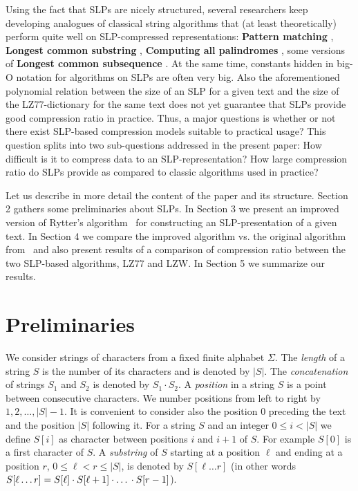 \documentclass[10pt]{article}
\begin{document}
Using the fact that SLPs are nicely structured, several researchers keep developing analogues of classical string
algorithms that (at least theoretically) perform quite well on SLP-compressed representations: \textbf{Pattern matching}
\cite{PM_and_HD}, \textbf{Longest common substring} \cite{LCSubstring}, \textbf{Computing all palindromes} \cite{LCSubstring}, some
versions of \textbf{Longest common subsequence} \cite{LCS_P}. At the same time, constants hidden in big-O notation for
algorithms on SLPs are often very big. Also the aforementioned polynomial relation between the size of an SLP for a
given text and the size of the LZ77-dictionary for the same text does not yet guarantee that SLPs provide good
compression ratio in practice. Thus, a major questions is whether or not there exist SLP-based compression models suitable
to practical usage? This question splits into two sub-questions addressed in the present paper: How difficult is it to
compress data to an SLP-representation? How large compression ratio do SLPs provide as compared to
classic algorithms used in practice?

Let us describe in more detail the content of the paper and its structure. Section 2 gathers some preliminaries about
SLPs. In Section 3 we present an improved version of Rytter's algorithm~\cite{SLPConstruction} for constructing
an SLP-presentation of a given text. In Section 4 we compare the improved algorithm vs. the original algorithm
from~\cite{SLPConstruction} and also present results of a comparison of compression ratio between the two SLP-based
algorithms, LZ77 and LZW. In Section 5 we summarize our results.

\section{Preliminaries}

We consider strings of characters from a fixed finite alphabet $\Sigma$. The \emph{length} of a string
$S$ is the number of its characters and is denoted by $|S|$. The \emph{concatenation} of strings $S_1$ and $S_2$
is denoted by $S_1 \cdot S_2$. A \emph{position} in a string $S$ is a point between consecutive characters. We number
positions from left to right by $1,2,\dots,|S|-1$. It is convenient to consider also the position 0 preceding the text
and the position $|S|$ following it. For a string $S$ and an integer $0 \leq i < |S|$ we define $S[i]$ as character
between positions $i$ and $i+1$ of $S$. For example $S[0]$ is a first character of $S$. A \emph{substring} of $S$
starting at a position $\ell$ and ending at a position $r$, $0\leq \ell < r \leq |S|$, is denoted by $S[\ell \dots r]$ (in other
words $S[\ell \dots r] = S[\ell] \cdot S[\ell + 1] \cdot \mbox{\dots} \cdot S[r-1]$).
\end{document}
